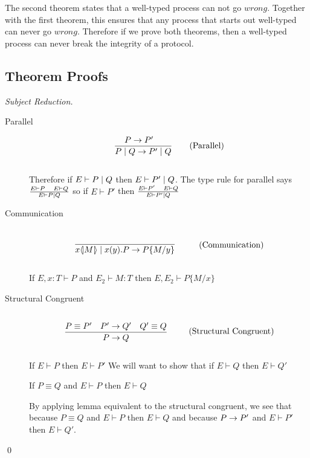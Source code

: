 The second theorem states that a well-typed process can not go $wrong$. Together with the first theorem, this ensures that any process that starts out well-typed can never go $wrong$. Therefore if we prove both theorems, then a well-typed process can never break the integrity of a protocol.
\subsection{Theorem Proofs}
\begin{proof}[Subject Reduction]
	\begin{description}
	\item[Parallel]
		\begin{align*}
		\frac{P \rightarrow P' \quad}{P \mid Q \rightarrow P' \mid Q} \tag{Parallel}
		\end{align*}\\
		
		Therefore if $E \vdash P \mid Q$ then $E \vdash P' \mid Q$. The type rule for parallel says $\frac{E \vdash P\quad E \vdash Q}{E \vdash P \mid Q}$ so if $E \vdash P'$ then $\frac{E \vdash P' \quad E \vdash Q}{E \vdash P' \mid Q}$\\
	\item[Communication]
		\begin{align*}
		\infrule{}{\lift{x}{M}\para\inp{x}{y}P\ra P\{M/y\}} \tag{Communication}
		\end{align*}
		
		\begin{lemma}[Substitution]
			If $E,x:T \vdash P$ and $E_2 \vdash M:T$ then $E, E_2 \vdash P\{M/x \}$
		\end{lemma}
	\item[Structural Congruent]
		\begin{align*}
		\infrule{P \equiv P' \quad P' \ra Q' \quad Q' \equiv Q}{P \ra Q} \tag{Structural Congruent}
		\end{align*}
		
		
		If $E \vdash P$ then $E \vdash P'$ We will want to show that if $E \vdash Q$ then $E \vdash Q'$
		
		\begin{lemma}[Equivalent]
			If $P \equiv Q$ and $E \vdash P$ then $E \vdash Q$
		\end{lemma}
		
		By applying lemma equivalent to the structural congruent, we see that because $P \equiv Q$ and $E \vdash P$ then $E \vdash Q$ and because $P \rightarrow P'$ and $E \vdash P'$ then $E \vdash Q'$.
	\end{description}
	\qed
\end{proof}
